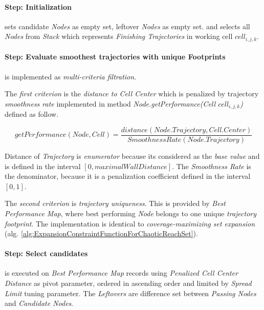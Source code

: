 \paragraph{Step: Initialization} sets candidate \emph{Nodes} as empty set, leftover \emph{Nodes} as empty set. and selects all \emph{Nodes} from \emph{Stack} which represents  \emph{Finishing Trajectories} in working cell $cell_{i,j,k}$.

\paragraph{Step: Evaluate smoothest trajectories with unique Footprints} is implemented as \emph{multi-criteria filtration}. 

The \emph{first criterion} is the \emph{distance to Cell Center} which is penalized by trajectory \emph{smoothness rate} implemented in method \emph{Node.getPerformance(Cell $cell_{i,j,k}$)} defined as follow.

\begin{equation}
    getPerformance(Node,Cell) = \frac{distance(Node.Trajectory,Cell.Center)}{SmoothnessRate(Node.Trajectory)}
\end{equation}

\noindent Distance of \emph{Trajectory} is \emph{enumerator} because its considered as the \emph{base value} and is defined in the interval $[0,maximalWallDistance]$. The \emph{Smoothness Rate} is the denominator, because it is a penalization coefficient defined in the interval $[0,1]$. 

The \emph{second criterion} is \emph{trajectory uniqueness}. This is provided by \emph{Best Performance Map}, where best performing \emph{Node} belongs to one unique \emph{trajectory footprint}. The implementation is identical to \emph{coverage-maximizing set expansion} (alg. \ref{alg:ExpansionConstraintFunctionForChaoticReachSet}).

\paragraph{Step: Select candidates} is executed  on \emph{Best Performance Map} records using \emph{Penalized Cell Center Distance} as pivot parameter, ordered in ascending order and limited by \emph{Spread Limit} tuning parameter. The \emph{Leftovers} are difference set between \emph{Passing Nodes} and \emph{Candidate Nodes}.




